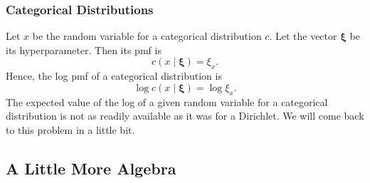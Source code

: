 \documentclass[12pt]{article}
\begin{document}
\subsubsection{Categorical Distributions}

Let $x$ be the random variable for a categorical distribution $c$.  Let the
vector $\bm{\xi}$ be its hyperparameter.  Then its pmf is
\begin{equation}\label{eq:catpmf}
    c(x \mid \bm{\xi}) = \xi_{x}.
\end{equation}
Hence, the log pmf of a categorical distribution is
\begin{equation}\label{eq:logcatpmf}
    \log c(x \mid \bm{\xi}) = \log \xi_{x}.
\end{equation}
The expected value of the log of a given random variable for a categorical
distribution is not as readily available as it was for a Dirichlet.  We will
come back to this problem in a little bit.

\subsection{A Little More Algebra}
\end{document}
